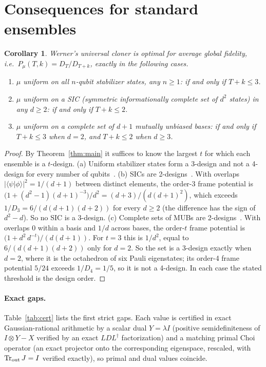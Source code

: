 \documentclass[11pt]{article}
\newcommand{\Tr}{\operatorname{Tr}}
\newtheorem{corollary}[theorem]{Corollary}
\theoremstyle{definition}
\theoremstyle{remark}
\begin{document}
\section{Consequences for standard ensembles}\label{sec:cor}
\begin{corollary}\label{cor:ensembles}
Werner's universal cloner is optimal for average global fidelity, i.e.\ $P_\mu(T,k)=D_T/D_{T+k}$, exactly in the
following cases.
\begin{enumerate}
\item[(a)] $\mu$ uniform on all $n$-qubit stabilizer states, any $n\ge1$: if and only if $T+k\le3$.
\item[(b)] $\mu$ uniform on a SIC (symmetric informationally complete set of $d^2$ states) in any $d\ge2$: if and only if
$T+k\le2$.
\item[(c)] $\mu$ uniform on a complete set of $d+1$ mutually unbiased bases: if and only if $T+k\le3$ when $d=2$, and
$T+k\le2$ when $d\ge3$.
\end{enumerate}
\end{corollary}
\begin{proof}
By Theorem~\ref{thm:main} it suffices to know the largest $t$ for which each ensemble is a $t$-design.
(a) Uniform stabilizer states form a 3-design and not a 4-design for every number of qubits~\cite{KuengGross2015}.
(b) SICs are 2-designs~\cite{Renes2004}. With overlaps $|\langle\psi|\phi\rangle|^2=1/(d+1)$ between distinct elements,
the order-3 frame potential is $\big(1+(d^2-1)(d+1)^{-3}\big)/d^2=(d+3)/(d(d+1)^2)$, which exceeds
$1/D_3=6/(d(d+1)(d+2))$ for every $d\ge2$ (the difference has the sign of $d^2-d$). So no SIC is a 3-design.
(c) Complete sets of MUBs are 2-designs~\cite{KlappeneckerRoetteler2005}. With overlaps $0$ within a basis and $1/d$
across bases, the order-$t$ frame potential is $\big(1+d^2\,d^{-t}\big)/(d(d+1))$. For $t=3$ this is $1/d^2$, equal to
$6/(d(d+1)(d+2))$ only for $d=2$. So the set is a 3-design exactly when $d=2$, where it is the octahedron of six
Pauli eigenstates; its order-4 frame potential $5/24$ exceeds $1/D_4=1/5$, so it is not a 4-design.
In each case the stated threshold is the design order.
\end{proof}

\paragraph{Exact gaps.} Table~\ref{tab:cert} lists the first strict gaps. Each value is certified in exact
Gaussian-rational arithmetic by a scalar dual $Y=\lambda I$ (positive semidefiniteness of $I\otimes Y-X$ verified by an
exact $LDL^\dagger$ factorization) and a matching primal Choi operator (an exact projector onto the corresponding
eigenspace, rescaled, with $\Tr_{\rm out}J=I$ verified exactly), so primal and dual values coincide.
\end{document}
